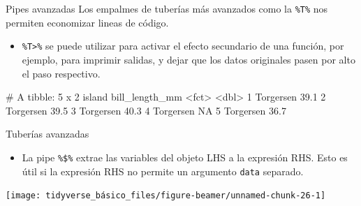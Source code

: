 \documentclass[
  ignorenonframetext,
  aspectratio=169]{beamer}
\newenvironment{Shaded}{\begin{snugshade}}{\end{snugshade}}
\newcommand{\AttributeTok}[1]{\textcolor[rgb]{0.13,0.29,0.53}{#1}}
\newcommand{\DecValTok}[1]{\textcolor[rgb]{0.00,0.00,0.81}{#1}}
\newcommand{\FunctionTok}[1]{\textcolor[rgb]{0.13,0.29,0.53}{\textbf{#1}}}
\newcommand{\NormalTok}[1]{#1}
\newcommand{\SpecialCharTok}[1]{\textcolor[rgb]{0.81,0.36,0.00}{\textbf{#1}}}
\newcommand{\StringTok}[1]{\textcolor[rgb]{0.31,0.60,0.02}{#1}}
\providecommand{\tightlist}{%
  \setlength{\itemsep}{0pt}\setlength{\parskip}{0pt}}
\let\oldverbatim\verbatim
\let\endoldverbatim\endverbatim
\renewenvironment{verbatim}{\tiny\oldverbatim}{\endoldverbatim}
\begin{document}
\begin{frame}[fragile]{Pipes avanzadas}
\label{pipes-avanzadas}
Los empalmes de tuberías más avanzados como la \texttt{\%T\%} nos
permiten economizar lineas de código.

\begin{itemize}
\tightlist
\item
  \texttt{\%T\textgreater{}\%} se puede utilizar para activar el efecto
  secundario de una función, por ejemplo, para imprimir salidas, y dejar
  que los datos originales pasen por alto el paso respectivo.
\end{itemize}

\begin{Shaded}
\end{Shaded}

\begin{verbatim}
# A tibble: 5 x 2
  island    bill_length_mm
  <fct>              <dbl>
1 Torgersen           39.1
2 Torgersen           39.5
3 Torgersen           40.3
4 Torgersen           NA  
5 Torgersen           36.7
\end{verbatim}

\begin{verbatim}
[1] 38.9
\end{verbatim}
\end{frame}

\begin{frame}[fragile]{Tuberías avanzadas}
\label{tuberuxedas-avanzadas}
\begin{itemize}
\tightlist
\item
  La pipe \texttt{\%\$\%} extrae las variables del objeto LHS a la
  expresión RHS. Esto es útil si la expresión RHS no permite un
  argumento \texttt{data} separado.
\end{itemize}

\begin{Shaded}
\end{Shaded}

\begin{center}\texttt{[image: tidyverse\_básico\_files/figure-beamer/unnamed-chunk-26-1]} \end{center}
\end{frame}
\end{document}
